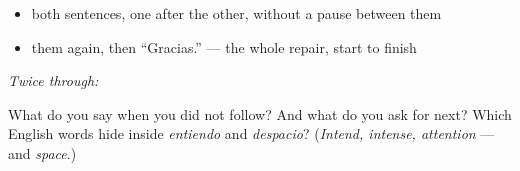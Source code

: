 \begin{itemize}
\raggedright
  \item both sentences, one after the other, without a pause between them
  \item them again, then \textquotedblleft{}Gracias.\textquotedblright{} — the whole repair, start to finish
\end{itemize}

\emph{Twice through:}

\begin{tcolorbox}[breakable,colback=teal!4,colframe=teal!35!black,title={Before you move on}]
What do you say when you did not follow? And what do you ask for next? Which English words hide inside \emph{entiendo} and \emph{despacio}? (\emph{Intend, intense, attention} — and \emph{space}.)
\end{tcolorbox}
